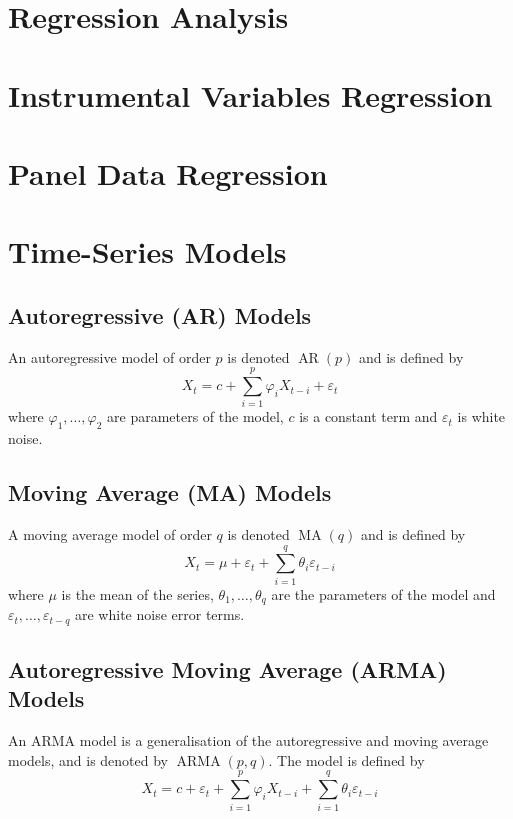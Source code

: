 \documentclass[11pt]{report} %
\begin{document}
\section{Regression Analysis}

\section{Instrumental Variables Regression}

\section{Panel Data Regression}

\section{Time-Series Models}

\subsection{Autoregressive (AR) Models}
An autoregressive model of order $p$ is denoted $\operatorname{AR}\left(p\right)$ and is defined by
\begin{equation}
X_{t} = c + \sum_{i = 1}^{p}\varphi_{i}X_{t - i} + \varepsilon_{t}
\end{equation}
where $\varphi_{1}, \dots, \varphi_{2}$ are parameters of the model, $c$ is a constant term and $\varepsilon_{t}$ is white noise.

\subsection{Moving Average (MA) Models}
A moving average model of order $q$ is denoted $\operatorname{MA}\left(q\right)$ and is defined by
\begin{equation}
X_{t} = \mu + \varepsilon_{t} + \sum_{i = 1}^{q}\theta_{i}\varepsilon_{t - i}
\end{equation}
where $\mu$ is the mean of the series, $\theta_{1}, \dots, \theta_{q}$ are the parameters of the model and $\varepsilon_{t}, \dots, \varepsilon_{t - q}$ are white noise error terms.

\subsection{Autoregressive Moving Average (ARMA) Models}
An ARMA model is a generalisation of the autoregressive and moving average models, and is denoted by $\operatorname{ARMA}\left(p, q\right)$. The model is defined by
\begin{equation}
X_{t} = c + \varepsilon_{t} + \sum_{i = 1}^{p}\varphi_{i}X_{t - i} + \sum_{i = 1}^{q}\theta_{i}\varepsilon_{t - i}
\end{equation}
\end{document}
